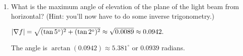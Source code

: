 \begin{enumerate}[leftmargin=0pt]
\begin{enumerate}
\begin{red}
        \end{red}
        \item What is the maximum angle of elevation of the plane of the light beam from horizontal? (Hint: you'll now have to do some inverse trigonometry.) 
        
        \begin{red}$|\nabla f| = \sqrt{(\tan 5^\circ)^2 + (\tan 2^\circ)^2} \approx \sqrt{0.0089} \approx 0.0942.$ 
            
            The angle is $\arctan(0.0942) \approx 5.381^\circ$ or $0.0939$ radians.
        \end{red}
    \end{enumerate}
    
\end{enumerate}

